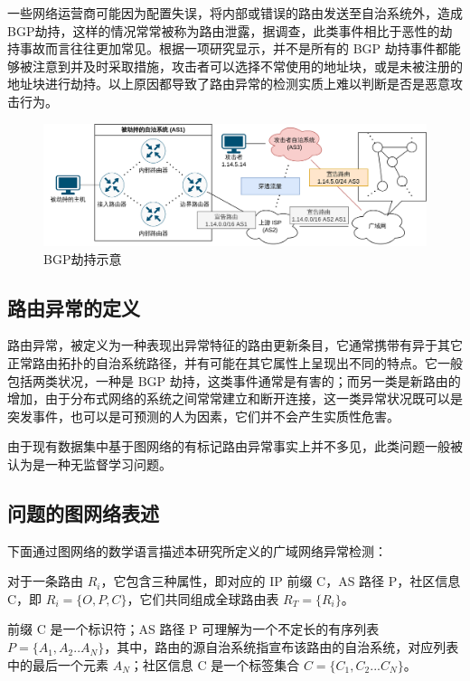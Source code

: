 一些网络运营商可能因为配置失误，将内部或错误的路由发送至自治系统外，造成BGP劫持，这样的情况常常被称为路由泄露，据调查，此类事件相比于恶性的劫持事故而言往往更加常见。根据一项研究显示，并不是所有的 BGP 劫持事件都能够被注意到并及时采取措施，攻击者可以选择不常使用的地址块，或是未被注册的地址块进行劫持。以上原因都导致了路由异常的检测实质上难以判断是否是恶意攻击行为。

\begin{figure}[h]
    \includegraphics[width=\linewidth]{chapter/c2_images/c2_hijack.png}
    \caption{BGP劫持示意}
    \label{bgp-hijack}
\end{figure}

\subsection{路由异常的定义}

路由异常，被定义为一种表现出异常特征的路由更新条目，它通常携带有异于其它正常路由拓扑的自治系统路径，并有可能在其它属性上呈现出不同的特点。它一般包括两类状况，一种是 BGP 劫持，这类事件通常是有害的；而另一类是新路由的增加，由于分布式网络的系统之间常常建立和断开连接，这一类异常状况既可以是突发事件，也可以是可预测的人为因素，它们并不会产生实质性危害。

由于现有数据集中基于图网络的有标记路由异常事实上并不多见，此类问题一般被认为是一种无监督学习问题。

\subsection{问题的图网络表述}

下面通过图网络的数学语言描述本研究所定义的广域网络异常检测：

对于一条路由 $R_i$，它包含三种属性，即对应的 IP 前缀 C，AS 路径 P，社区信息 C，即 $R_i = \{ O, P, C \}$，它们共同组成全球路由表 $R_T = \{ R_i \}$。

前缀 C 是一个标识符；AS 路径 P 可理解为一个不定长的有序列表 $P = \{A_1,A_2..A_N\}$，其中，路由的源自治系统指宣布该路由的自治系统，对应列表中的最后一个元素 $A_N$；社区信息 C 是一个标签集合 $C = \{C_1,C_2...C_N\}$。

